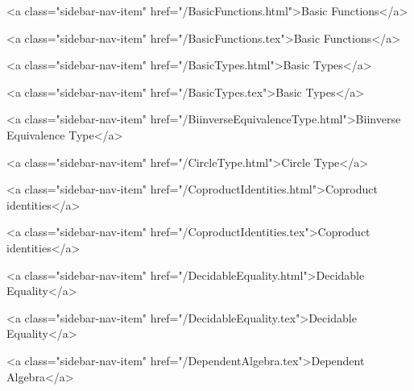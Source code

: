       
    
      
        
          <a class="sidebar-nav-item" href="/BasicFunctions.html">Basic Functions</a>
        
      
    
      
        
          <a class="sidebar-nav-item" href="/BasicFunctions.tex">Basic Functions</a>
        
      
    
      
        
          <a class="sidebar-nav-item" href="/BasicTypes.html">Basic Types</a>
        
      
    
      
        
          <a class="sidebar-nav-item" href="/BasicTypes.tex">Basic Types</a>
        
      
    
      
        
          <a class="sidebar-nav-item" href="/BiinverseEquivalenceType.html">Biinverse Equivalence Type</a>
        
      
    
      
        
          <a class="sidebar-nav-item" href="/CircleType.html">Circle Type</a>
        
      
    
      
        
          <a class="sidebar-nav-item" href="/CoproductIdentities.html">Coproduct identities</a>
        
      
    
      
        
          <a class="sidebar-nav-item" href="/CoproductIdentities.tex">Coproduct identities</a>
        
      
    
      
        
          <a class="sidebar-nav-item" href="/DecidableEquality.html">Decidable Equality</a>
        
      
    
      
        
          <a class="sidebar-nav-item" href="/DecidableEquality.tex">Decidable Equality</a>
        
      
    
      
        
          <a class="sidebar-nav-item" href="/DependentAlgebra.tex">Dependent Algebra</a>
        
